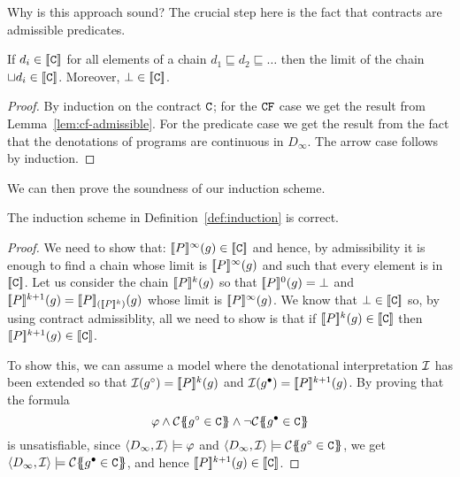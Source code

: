 Why is this approach sound? The crucial step here is the fact that contracts are admissible predicates.
\begin{theorem}
If $d_i \in \dbrace{\Ct}$ for all elements of a chain $d_1 \sqsubseteq d_2 \sqsubseteq \ldots$ then the limit of the chain 
$\sqcup d_i \in \dbrace{\Ct}$. Moreover, $\bot \in \dbrace{\Ct}$.
\end{theorem}
\begin{proof} By induction on the contract $\Ct$; for the $\CF$ case we get the result from Lemma~\ref{lem:cf-admissible}.
For the predicate case we get the result from the fact that the denotations of programs 
are continuous in $D_{\infty}$. The arrow case follows by induction.
\end{proof}

We can then prove the soundness of our induction scheme.
\begin{theorem} The induction scheme in Definition~\ref{def:induction} is correct. \end{theorem}
\begin{proof} We need to show that: 
$\dbrace{P}^{\infty}(g) \in \dbrace{\Ct}$ and hence, by admissibility it is enough to find
a chain whose limit is $\dbrace{P}^{\infty}(g)$ and such that every element is in $\dbrace{\Ct}$.
Let us consider the chain $\dbrace{P}^{k}(g)$ so that $\dbrace{P}^0(g) = \bot$ and 
$\dbrace{P}^{k+1}(g) = \dbrace{P}_{(\dbrace{P}^{k})}(g)$ whose limit is $\dbrace{P}^{\infty}(g)$. We 
know that $\bot \in \dbrace{\Ct}$ so, by using contract admissiblity, all we need to show is
that if $\dbrace{P}^{k}(g) \in \dbrace{\Ct}$ then $\dbrace{P}^{k+1}(g) \in \dbrace{\Ct}$. 

To show this, we can assume a model where the denotational interpretation ${\cal I}$ has been 
extended so that ${\cal I}(g^{\circ}) = \dbrace{P}^{k}(g)$ and ${\cal I}(g^{\bullet}) = \dbrace{P}^{k+1}(g)$.
By proving that the formula 
\[ \phi \land \ctrans{}{}{g^{\circ} \in \Ct} \land \neg \ctrans{}{}{g^{\bullet} \in \Ct} \] 
is unsatisfiable, since $\langle D_{\infty},{\cal I}\rangle \models \phi$ and 
$\langle D_{\infty},{\cal I}\rangle \models \ctrans{}{}{g^{\circ} \in \Ct}$, we get
$\langle D_{\infty},{\cal I}\rangle \models \ctrans{}{}{g^{\bullet} \in \Ct}$, 
and hence $\dbrace{P}^{k+1}(g) \in \dbrace{\Ct}$.
\end{proof} 

